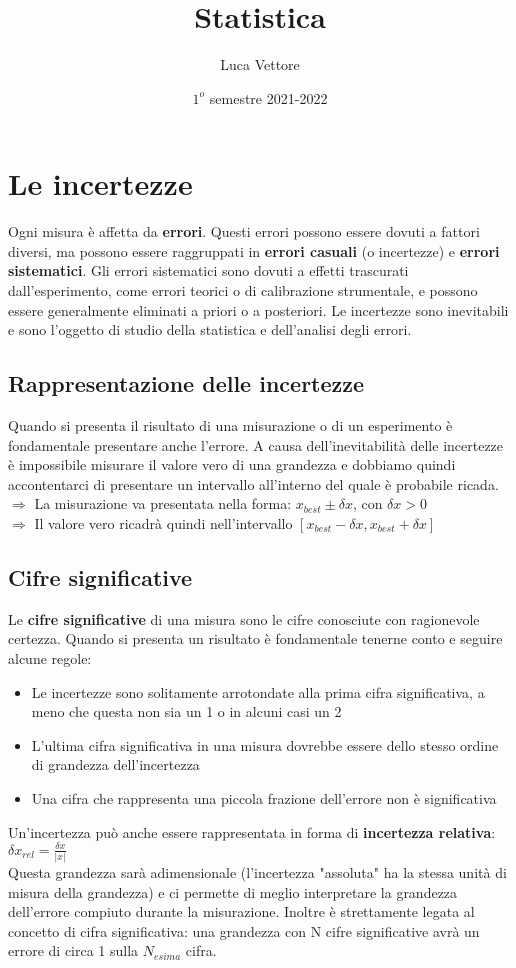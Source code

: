 \documentclass{article}
\title{Statistica}
\author{Luca Vettore}
\date{$1^o$ semestre 2021-2022}
\begin{document}
\maketitle

\section{Le incertezze}
Ogni misura è affetta da \textbf{errori}. Questi errori possono essere dovuti a fattori diversi, ma possono essere raggruppati in \textbf{errori casuali} (o incertezze) e \textbf{errori sistematici}. Gli errori sistematici sono dovuti a effetti trascurati dall'esperimento, come errori teorici o di calibrazione strumentale, e possono essere generalmente eliminati a priori o a posteriori. Le incertezze sono inevitabili e sono l'oggetto di studio della statistica e dell'analisi degli errori.

\subsection{Rappresentazione delle incertezze}
Quando si presenta il risultato di una misurazione o di un esperimento è fondamentale presentare anche l'errore. A causa dell'inevitabilità delle incertezze è impossibile misurare il valore vero di una grandezza e dobbiamo quindi accontentarci di presentare un intervallo all'interno del quale è probabile ricada.\\
$\Rightarrow$ La misurazione va presentata nella forma: $x_{best} \pm \delta x$, con $\delta x > 0$\\
$\Rightarrow$ Il valore vero ricadrà quindi nell'intervallo $[x_{best} - \delta x, x_{best} + \delta x]$

\subsection{Cifre significative}
Le \textbf{cifre significative} di una misura sono le cifre conosciute con ragionevole certezza. Quando si presenta un risultato è fondamentale tenerne conto e seguire alcune regole:
\begin{itemize}
    \item Le incertezze sono solitamente arrotondate alla prima cifra significativa, a meno che questa non sia un 1 o in alcuni casi un 2
    \item L'ultima cifra significativa in una misura dovrebbe essere dello stesso ordine di grandezza dell'incertezza
    \item Una cifra che rappresenta una piccola frazione dell'errore non è significativa
\end{itemize}
Un'incertezza può anche essere rappresentata in forma di \textbf{incertezza relativa}: $\delta x_{rel} = \frac{\delta x}{|x|}$\\
Questa grandezza sarà adimensionale (l'incertezza "assoluta" ha la stessa unità di misura della grandezza) e ci permette di meglio interpretare la grandezza dell'errore compiuto durante la misurazione. Inoltre è strettamente legata al concetto di cifra significativa: una grandezza con N cifre significative avrà un errore di circa 1 sulla $N_{esima}$ cifra.
\end{document}
